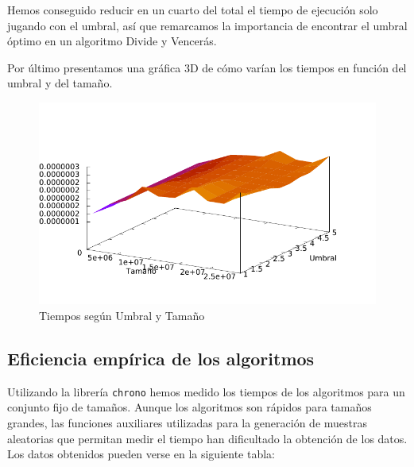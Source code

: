 Hemos conseguido reducir en un cuarto del total el tiempo de ejecución solo jugando con el umbral, así que remarcamos la importancia de encontrar el umbral óptimo en un algoritmo Divide y Vencerás. \\

\newpage

Por último presentamos una gráfica 3D de cómo varían los tiempos en función del umbral y del tamaño.

\begin{figure}[H]\includegraphics[width=13cm]{img/umbral_posicion.pdf} \centering
	\caption{Tiempos según Umbral y Tamaño}\end{figure}

\newpage

\subsection{Eficiencia empírica de los algoritmos}

Utilizando la librería \texttt{chrono} hemos medido los tiempos de los algoritmos para un conjunto fijo de tamaños. Aunque los algoritmos son rápidos para tamaños grandes, las funciones auxiliares utilizadas para la generación de muestras aleatorias que permitan medir el tiempo han dificultado la obtención de los datos. Los datos obtenidos pueden verse en la siguiente tabla:



\vspace*{1cm}

\posObvio
{}\posDyV
{}\posDyVTwo
{} {\posObvio}
 {\posObvio}

